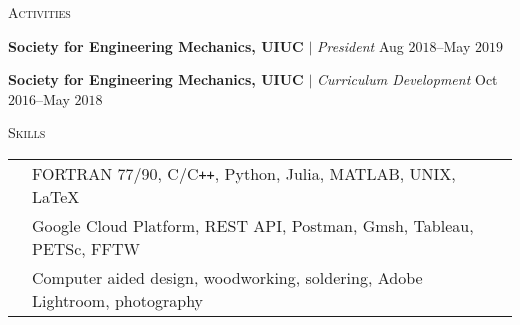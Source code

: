 \documentclass[10pt]{article}
\begin{document}
\begin{multicols}{2}
\textsc{Activities}
\columnbreak

\textbf{Society for Engineering Mechanics, UIUC} $|$ \textit{President} \hfill Aug $2018$--May $2019$

\vspace{-0.75em}

%
\textbf{Society for Engineering Mechanics, UIUC} $|$ \textit{Curriculum Development} \hfill Oct $2016$--May $2018$

%
\end{multicols}
\vspace{-1.5em} 
\begin{multicols}{2}
\textsc{Skills}
\columnbreak

\begin {table}[H]
\begin{tabular}{l l }
\hspace{-0.6em}{Programming} & \hspace{-0.5em} FORTRAN 77/90, C/C\texttt{++}, Python, Julia, MATLAB, UNIX, \LaTeX{}\\
\hspace{-0.6em}{Technologies} & \hspace{-0.5em} Google Cloud Platform, REST API, Postman, Gmsh, Tableau, PETSc, FFTW\\
\hspace{-0.6em}{Design     } & \hspace{-0.5em} Computer aided design, woodworking, soldering, Adobe Lightroom, photography\\
\end{tabular}	
\end{table}

\end{multicols}
\end{document}

